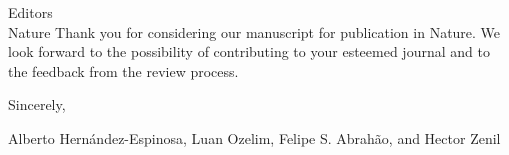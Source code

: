 \documentclass[11pt]{letter}
\begin{document}
\begin{letter}{Editors\\Nature}
Thank you for considering our manuscript for publication in Nature. We look forward to the possibility of contributing to your esteemed journal and to the feedback from the review process.
\vspace{1cm}

\closing{Sincerely,}

\vspace{1cm}

Alberto Hernández-Espinosa, Luan Ozelim, Felipe S. Abrahão, and Hector Zenil

\end{letter}
\end{document}

